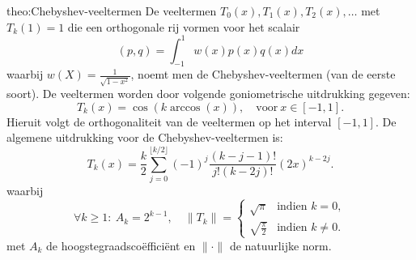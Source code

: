 \begin{theo}{theo:Chebyshev-veeltermen}
    De veeltermen $T_0(x), T_1(x), T_2(x), \ldots$ met $T_k(1) = 1$ die een orthogonale rij vormen voor het scalair 
    \begin{equation*}
        (p,q) = \int_{-1}^{1} w(x)p(x)q(x)dx
    \end{equation*}
    waarbij $w(X) = \frac{1}{\sqrt{1-x^2}}$, noemt men de Chebyshev-veeltermen (van de eerste soort). De veeltermen worden door volgende goniometrische uitdrukking gegeven:
    \begin{equation*}
        T_k(x) = \cos(k\arccos(x)), \quad \text{voor} \ x \in [-1,1].
    \end{equation*}
    Hieruit volgt de orthogonaliteit van de veeltermen op het interval $[-1,1]$.
    De algemene uitdrukking voor de Chebyshev-veeltermen is:
    \begin{equation*}
        T_k(x) = \frac{k}{2} \sum_{j=0}^{\lfloor k/2 \rfloor} (-1)^j \frac{(k-j-1)!}{j!(k-2j)!} (2x)^{k-2j}.
    \end{equation*}
    waarbij 
    \begin{equation*}
        \forall k \geq 1:\ A_k = 2^{k-1}, \quad \|T_k\| = \begin{cases}
            \sqrt{\pi} & \text{indien } k = 0, \\
            \sqrt{\frac{\pi}{2}} & \text{indien } k \neq 0.
        \end{cases}
    \end{equation*}
    met $A_k$ de hoogstegraadscoëfficiënt en $\|\cdot\|$ de natuurlijke norm.
\end{theo}

